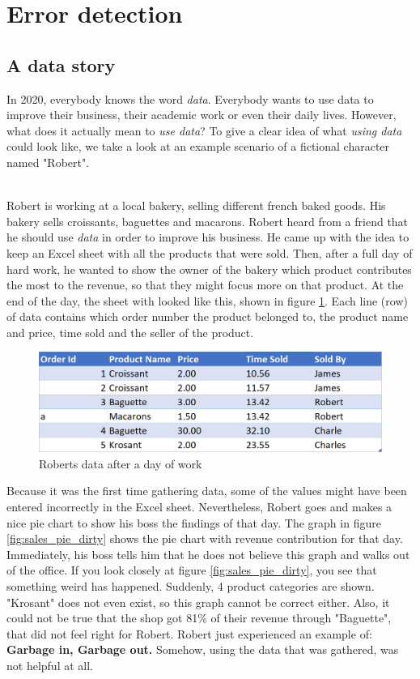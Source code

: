\section{Error detection}
\label{sec:errordetection_intro}
\subsection{A data story}
\label{subsec:data_story}
In 2020, everybody knows the word \textit{data}. Everybody wants to use data to improve their business, their academic work or even their daily lives. However, what does it actually mean to \textit{use data}? To give a clear idea of what \textit{using data} could look like, we take a look at an example scenario of a fictional character named "Robert". 

~\\Robert is working at a local bakery, selling different french baked goods. His bakery sells croissants, baguettes and macarons. Robert heard from a friend that he should use \textit{data} in order to improve his business. He came up with the idea to keep an Excel sheet with all the products that were sold. Then, after a full day of hard work, he wanted to show the owner of the bakery which product contributes the most to the revenue, so that they might focus more on that product. 
At the end of the day, the sheet with looked like this, shown in figure \ref{fig:dirty_data_robert}. Each line (row) of data contains which order number the product belonged to, the product name and price, time sold and the seller of the product.

\begin{figure}
    \centering
    \includegraphics[width=0.9\linewidth]{thesis/Figures/DirtyDataset.png}
    \caption{Roberts data after a day of work}
    \label{fig:dirty_data_robert}
\end{figure}

Because it was the first time gathering data, some of the values might have been entered incorrectly in the Excel sheet. Nevertheless, Robert goes and makes a nice pie chart to show his boss the findings of that day. The graph in figure \ref{fig:sales_pie_dirty} shows the pie chart with revenue contribution for that day.
Immediately, his boss tells him that he does not believe this graph and walks out of the office. 
If you look closely at figure \ref{fig:sales_pie_dirty}, you see that something weird has happened. Suddenly, 4 product categories are shown. "Krosant" does not even exist, so this graph cannot be correct either. Also, it could not be true that the shop got 81\% of their revenue through "Baguette", that did not feel right for Robert. Robert just experienced an example of: \textbf{Garbage in, Garbage out.} Somehow, using the data that was gathered, was not helpful at all.

